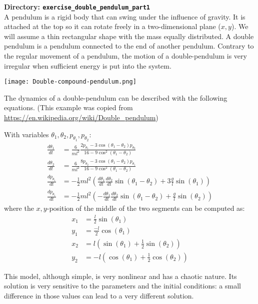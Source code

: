 {\bf Directory: {\tt exercise\_double\_pendulum\_part1}}\\

A pendulum is a rigid body that can swing under the influence of gravity. It is attached at the top so it can rotate freely in a two-dimensional plane ($x,y$).
We will assume a thin rectangular shape with the mass equally distributed. A double pendulum is a pendulum connected to the end of another pendulum. Contrary to the 
regular movement of a pendulum, the motion of a double-pendulum is very irregular when sufficient energy is put into the system. 

\begin{center}
    \texttt{[image: Double-compound-pendulum.png]}
\end{center}

The dynamics of a double-pendulum can be described with the following equations. 
(This example was copied from \url{https://en.wikipedia.org/wiki/Double_pendulum})

With variables $\theta_1, \theta_2, p_{\theta_1}, p_{\theta_2}$:
\begin{align}
   \frac{d \theta_1}{dt}&= \frac{6}{m l^2} \frac{2 p_{\theta_1} - 3\cos(\theta_1-\theta_2) p_{\theta_2}}
   {16-9 \cos^2(\theta_1-\theta_2)}\\
   \frac{d \theta_2}{dt}&= \frac{6}{m l^2} \frac{8 p_{\theta_2} - 3\cos(\theta_1-\theta_2) p_{\theta_1}}
   {16-9 \cos^2(\theta_1-\theta_2)}\\
   \frac{dp_{\theta_1}}{dt} &= -\frac{1}{2} ml^2 \left( \frac{d \theta_1}{dt} \frac{d \theta_2}{dt} \sin(\theta_1-\theta_2) + 3\frac{g}{l} \sin(\theta_1) \right)  \\
   \frac{dp_{\theta_1}}{dt} &= -\frac{1}{2} ml^2 \left( -\frac{d \theta_1}{dt} \frac{d \theta_2}{dt} \sin(\theta_1-\theta_2) + \frac{g}{l} \sin(\theta_2) \right) 
\end{align}
where the $x,y$-position of the middle of the two segments can be computed as:
\begin{align}
   x_1 &= \frac{l}{2} \sin(\theta_1) \\
   y_1 &= \frac{-l}{2} \cos(\theta_1) \\
   x_2 &= l ( \sin(\theta_1) + \frac{1}{2} \sin(\theta_2) ) \\
   y_2 &= -l ( \cos(\theta_1) + \frac{1}{2} \cos(\theta_2) )
\end{align}

This model, although simple, is very nonlinear and has a chaotic nature.  Its
solution is very sensitive to the parameters and the initial conditions: a
small difference in those values can lead to a very different solution.

